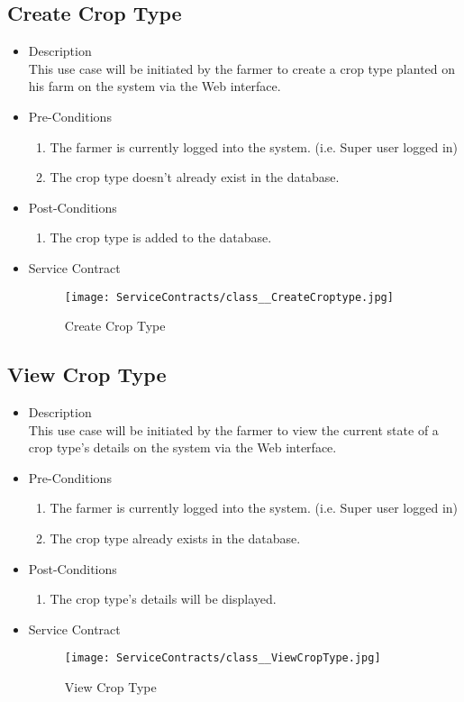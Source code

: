 \documentclass[11pt,fleqn]{book} %
\begin{document}
\subsection{Create Crop Type}
\begin{itemize}
	\item Description\\
	This use case will be initiated by the farmer to create a crop type planted on his farm on the system via the Web interface.
	\item Pre-Conditions
	\begin{enumerate}
		\item The farmer is currently logged into the system. (i.e. Super user logged in)
		\item The crop type doesn’t already exist in the database. 
	\end{enumerate}
	\item Post-Conditions
	\begin{enumerate}
		\item The crop type is added to the database.
	\end{enumerate}
	\item Service Contract
	\begin{figure}
		\texttt{[image: ServiceContracts/class\_\_CreateCroptype.jpg]}
		\caption{Create Crop Type}
	\end{figure}
\end{itemize}

\subsection{View Crop Type}
\begin{itemize}
	\item Description\\
	This use case will be initiated by the farmer to view the current state of a crop type’s details on the system via the Web interface.
	\item Pre-Conditions
	\begin{enumerate}
		\item The farmer is currently logged into the system. (i.e. Super user logged in)
		\item The crop type already exists in the database.			
	\end{enumerate}
	\item Post-Conditions
	\begin{enumerate}
		\item The crop type’s details will be displayed.
	\end{enumerate}
	\item Service Contract
	\begin{figure}
		\texttt{[image: ServiceContracts/class\_\_ViewCropType.jpg]}
		\caption{View Crop Type}
	\end{figure}
\end{itemize}
\end{document}
